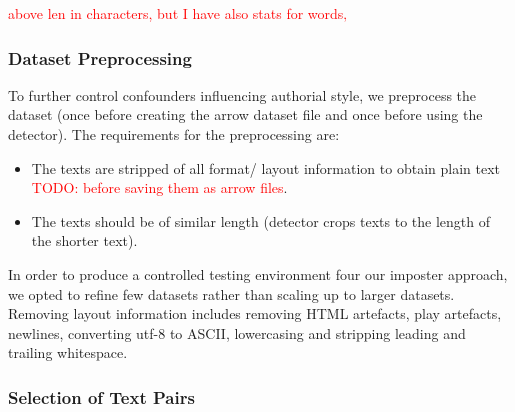 \begin{table}[h]
\centering\small
\caption{Statistics of preprocessed datasets \dataPan{}, \dataBlog{} and \dataGutenberg{}.}
\label{tab:data_stats}
\end{table}
\textcolor{red}{above len in characters, but I have also stats for words‚}


\subsubsection{Dataset Preprocessing}
\label{subsubsec:dataset_preprocessing}

To further control confounders influencing authorial style, we preprocess the dataset 
(once before creating the arrow dataset file and once before using the detector).
The requirements for the preprocessing are:
\begin{itemize}
    \item The texts are stripped of all format/ layout information to obtain plain text \textcolor{red}{TODO: before saving them as arrow files}.
    \item The texts should be of similar length (detector crops texts to the length of the shorter text).
\end{itemize}
In order to produce a controlled testing environment four our imposter approach, 
we opted to refine few datasets rather than scaling up to larger datasets.
Removing layout information includes removing HTML artefacts, play artefacts, newlines, 
converting utf-8 to ASCII, lowercasing and stripping leading and trailing whitespace.

\subsubsection{Selection of Text Pairs}
\label{subsubsec:dataset_text_pair_selection}

